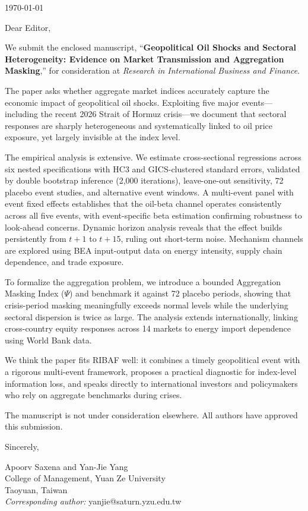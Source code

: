 \documentclass[12pt]{article}
\begin{document}
\noindent\today

\bigskip

\noindent Dear Editor,

\bigskip

\noindent We submit the enclosed manuscript, ``\textbf{Geopolitical Oil Shocks and Sectoral Heterogeneity: Evidence on Market Transmission and Aggregation Masking},'' for consideration at \textit{Research in International Business and Finance}.

The paper asks whether aggregate market indices accurately capture the economic impact of geopolitical oil shocks. Exploiting five major events---including the recent 2026 Strait of Hormuz crisis---we document that sectoral responses are sharply heterogeneous and systematically linked to oil price exposure, yet largely invisible at the index level.

The empirical analysis is extensive. We estimate cross-sectional regressions across six nested specifications with HC3 and GICS-clustered standard errors, validated by double bootstrap inference (2,000 iterations), leave-one-out sensitivity, 72 placebo event studies, and alternative event windows. A multi-event panel with event fixed effects establishes that the oil-beta channel operates consistently across all five events, with event-specific beta estimation confirming robustness to look-ahead concerns. Dynamic horizon analysis reveals that the effect builds persistently from $t+1$ to $t+15$, ruling out short-term noise. Mechanism channels are explored using BEA input-output data on energy intensity, supply chain dependence, and trade exposure.

To formalize the aggregation problem, we introduce a bounded Aggregation Masking Index ($\Psi$) and benchmark it against 72 placebo periods, showing that crisis-period masking meaningfully exceeds normal levels while the underlying sectoral dispersion is twice as large. The analysis extends internationally, linking cross-country equity responses across 14 markets to energy import dependence using World Bank data.

We think the paper fits RIBAF well: it combines a timely geopolitical event with a rigorous multi-event framework, proposes a practical diagnostic for index-level information loss, and speaks directly to international investors and policymakers who rely on aggregate benchmarks during crises.

The manuscript is not under consideration elsewhere. All authors have approved this submission.

\bigskip

\noindent Sincerely,

\bigskip

\noindent Apoorv Saxena and Yan-Jie Yang\\
College of Management, Yuan Ze University\\
Taoyuan, Taiwan\\
\noindent\textit{Corresponding author:} yanjie@saturn.yzu.edu.tw
\end{document}
